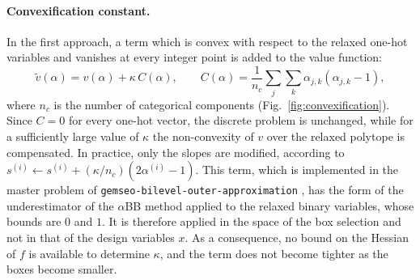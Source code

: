 \documentclass[pdflatex,sn-basic]{sn-jnl}
\newcommand{\code}[1]{\texttt{\hyphenchar\font=45\relax #1}}
\begin{document}
\paragraph{Convexification constant.} In the first approach, a term which is
convex with respect to the relaxed one-hot variables and vanishes at every
integer point is added to the value function:
\begin{equation}\label{eq:convexification}
  \tilde v(\alpha) = v(\alpha) + \kappa\, C(\alpha),
  \qquad
  C(\alpha) = \frac{1}{n_c}\sum_{j}\sum_{k} \alpha_{j,k}(\alpha_{j,k}-1),
\end{equation}
where $n_c$ is the number of categorical components
(Fig.~\ref{fig:convexification}). Since $C = 0$ for every one-hot vector, the
discrete problem is unchanged, while for a sufficiently large value of $\kappa$
the non-convexity of $v$ over the relaxed polytope is compensated. In practice,
only the slopes are modified, according to
$s^{(i)} \gets s^{(i)} + (\kappa/n_c)(2\alpha^{(i)} - 1)$.
This term, which is implemented in the master problem of
\code{gemseo-bilevel-outer-approximation} \citep{gemseobilevel}, has the form of the underestimator of the $\alpha$BB method
\citep{androulakis1995,adjiman1998} applied to the relaxed binary variables,
whose bounds are $0$ and $1$. It is therefore applied in the space of the box
selection and not in that of the design variables $x$. As a consequence, no
bound on the Hessian of $f$ is available to determine $\kappa$, and the term does
not become tighter as the boxes become smaller.
\end{document}
